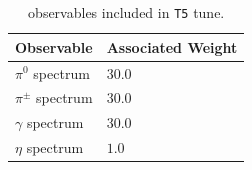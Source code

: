 \documentclass[aps,preprint,floatfix,nofootinbib,showpacs]{revtex4-1}
\begin{document}
 \begin{table}[tbp]
  \begin{center}
   \begin{tabular}{l|l}
    \hline 
    \hline
    Observable  \hspace{3cm} &  \hspace{1cm} Associated Weight \\ \hline
    $\pi^0$ spectrum & \hspace{3cm} $30.0$ \\ \hline
    $\pi^\pm$ spectrum & \hspace{3cm} $30.0$ \\ \hline
    $\gamma$ spectrum & \hspace{3cm} $30.0$ \\ \hline
    $\eta$ spectrum & \hspace{3cm} $1.0$ \\ \hline \hline
   \end{tabular}
  \end{center}
  \caption{observables included in \texttt{T5} tune.}
  \label{Tab7}
\end{table}
\clearpage 
\end{document}
